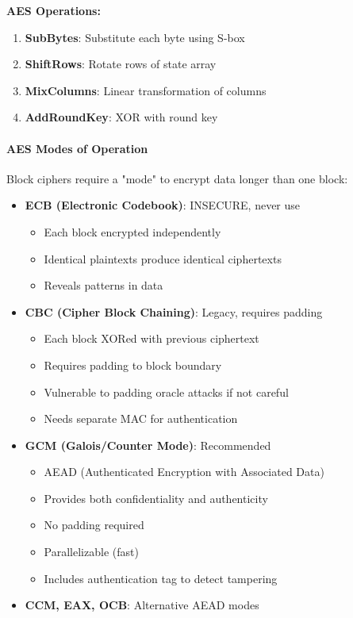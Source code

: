 \textbf{AES Operations:}
\begin{enumerate}
    \item \textbf{SubBytes}: Substitute each byte using S-box
    \item \textbf{ShiftRows}: Rotate rows of state array
    \item \textbf{MixColumns}: Linear transformation of columns
    \item \textbf{AddRoundKey}: XOR with round key
\end{enumerate}

\paragraph{AES Modes of Operation}

Block ciphers require a "mode" to encrypt data longer than one block:

\begin{itemize}
    \item \textbf{ECB (Electronic Codebook)}: INSECURE, never use
    \begin{itemize}
        \item Each block encrypted independently
        \item Identical plaintexts produce identical ciphertexts
        \item Reveals patterns in data
    \end{itemize}
    
    \item \textbf{CBC (Cipher Block Chaining)}: Legacy, requires padding
    \begin{itemize}
        \item Each block XORed with previous ciphertext
        \item Requires padding to block boundary
        \item Vulnerable to padding oracle attacks if not careful
        \item Needs separate MAC for authentication
    \end{itemize}
    
    \item \textbf{GCM (Galois/Counter Mode)}: Recommended
    \begin{itemize}
        \item AEAD (Authenticated Encryption with Associated Data)
        \item Provides both confidentiality and authenticity
        \item No padding required
        \item Parallelizable (fast)
        \item Includes authentication tag to detect tampering
    \end{itemize}
    
    \item \textbf{CCM, EAX, OCB}: Alternative AEAD modes
\end{itemize}

